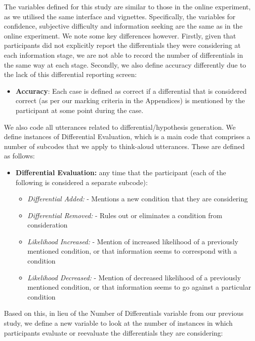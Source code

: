 \documentclass[a4paper, nobind]{templates/ociamthesis}
\providecommand{\tightlist}{%
  \setlength{\itemsep}{0pt}\setlength{\parskip}{0pt}}
\begin{document}
The variables defined for this study are similar to those in the online experiment, as we utilised the same interface and vignettes. Specifically, the variables for confidence, subjective difficulty and information seeking are the same as in the online experiment. We note some key differences however. Firstly, given that participants did not explicitly report the differentials they were considering at each information stage, we are not able to record the number of differentials in the same way at each stage. Secondly, we also define accuracy differently due to the lack of this differential reporting screen:

\begin{itemize}
\tightlist
\item
  \textbf{Accuracy}: Each case is defined as correct if a differential that is considered correct (as per our marking criteria in the Appendices) is mentioned by the participant at some point during the case.
\end{itemize}

We also code all utterances related to differential/hypothesis generation. We define instances of Differential Evaluation, which is a main code that comprises a number of subcodes that we apply to think-aloud utterances. These are defined as follows:

\begin{itemize}
\tightlist
\item
  \textbf{Differential Evaluation:} any time that the participant (each of the following is considered a separate subcode):

  \begin{itemize}
  \tightlist
  \item
    \emph{Differential Added:} - Mentions a new condition that they are considering
  \item
    \emph{Differential Removed:} - Rules out or eliminates a condition from consideration
  \item
    \emph{Likelihood Increased:} - Mention of increased likelihood of a previously mentioned condition, or that information seems to correspond with a condition
  \item
    \emph{Likelihood Decreased:} - Mention of decreased likelihood of a previously mentioned condition, or that information seems to go against a particular condition
  \end{itemize}
\end{itemize}

Based on this, in lieu of the Number of Differentials variable from our previous study, we define a new variable to look at the number of instances in which participants evaluate or reevaluate the differentials they are considering:
\end{document}

